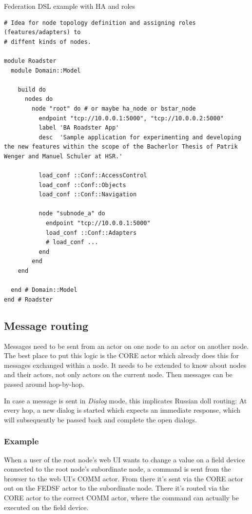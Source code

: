 \begin{listing}
	\caption{Federation DSL example with HA and roles}
	\label{lst:dsl:topo:with-roles}
	\begin{verbatim}
# Idea for node topology definition and assigning roles (features/adapters) to
# diffent kinds of nodes.

module Roadster
  module Domain::Model

    build do
      nodes do
        node "root" do # or maybe ha_node or bstar_node
          endpoint "tcp://10.0.0.1:5000", "tcp://10.0.0.2:5000"
          label 'BA Roadster App'
          desc  'Sample application for experimenting and developing the new features within the scope of the Bacherlor Thesis of Patrik Wenger and Manuel Schuler at HSR.'

          load_conf ::Conf::AccessControl
          load_conf ::Conf::Objects
          load_conf ::Conf::Navigation

          node "subnode_a" do
            endpoint "tcp://10.0.0.1:5000"
            load_conf ::Conf::Adapters
            # load_conf ...
          end
        end
    end

  end # Domain::Model
end # Roadster
	\end{verbatim}
\end{listing}


\subsection{Message routing}
Messages need to be sent from an actor on one node to an actor on another node.
The best place to put this logic is the CORE actor which already does this for
messages exchanged within a node. It needs to be extended to know about nodes
and their actors, not only actors on the current node. Then messages can be
passed around hop-by-hop.

In case a message is sent in \emph{Dialog} mode, this implicates Russian doll
routing: At every hop, a new dialog is started which expects an immediate
response, which will subsequently be passed back and complete the open dialogs.

\subsubsection{Example}
When a user of the root node's web UI wants to change a value on a field device
connected to the root node's subordinate node, a command is sent from the
browser to the web UI's COMM actor. From there it's sent via the CORE actor out
on the FEDSF actor to the subordinate node. There it's routed
via the CORE actor to the correct COMM actor, where the command can actually be
executed on the field device.

